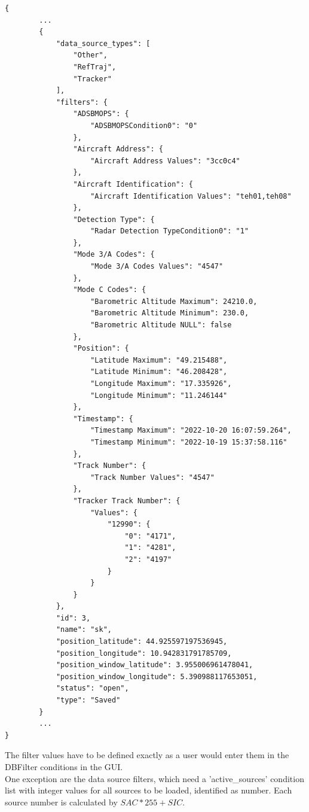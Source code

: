 \begin{lstlisting}[basicstyle=\small\ttfamily]
{
        ...
        {
            "data_source_types": [
                "Other",
                "RefTraj",
                "Tracker"
            ],
            "filters": {
                "ADSBMOPS": {
                    "ADSBMOPSCondition0": "0"
                },
                "Aircraft Address": {
                    "Aircraft Address Values": "3cc0c4"
                },
                "Aircraft Identification": {
                    "Aircraft Identification Values": "teh01,teh08"
                },
                "Detection Type": {
                    "Radar Detection TypeCondition0": "1"
                },
                "Mode 3/A Codes": {
                    "Mode 3/A Codes Values": "4547"
                },
                "Mode C Codes": {
                    "Barometric Altitude Maximum": 24210.0,
                    "Barometric Altitude Minimum": 230.0,
                    "Barometric Altitude NULL": false
                },
                "Position": {
                    "Latitude Maximum": "49.215488",
                    "Latitude Minimum": "46.208428",
                    "Longitude Maximum": "17.335926",
                    "Longitude Minimum": "11.246144"
                },
                "Timestamp": {
                    "Timestamp Maximum": "2022-10-20 16:07:59.264",
                    "Timestamp Minimum": "2022-10-19 15:37:58.116"
                },
                "Track Number": {
                    "Track Number Values": "4547"
                },
                "Tracker Track Number": {
                    "Values": {
                        "12990": {
                            "0": "4171",
                            "1": "4281",
                            "2": "4197"
                        }
                    }
                }
            },
            "id": 3,
            "name": "sk",
            "position_latitude": 44.925597197536945,
            "position_longitude": 10.942831791785709,
            "position_window_latitude": 3.955006961478041,
            "position_window_longitude": 5.390988117653051,
            "status": "open",
            "type": "Saved"
        }
        ...
}
\end{lstlisting}

The filter values have to be defined exactly as a user would enter them in the DBFilter conditions in the GUI. \\

One exception are the data source filters, which need a 'active\_sources' condition list with integer values for all sources to be loaded, identified as number. Each source number is calculated by $SAC*255+SIC$. \\

